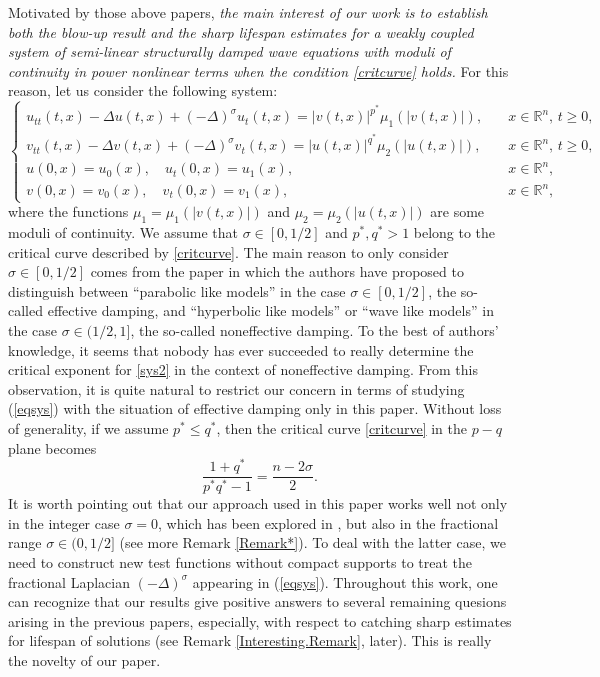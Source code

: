 \documentclass[11pt,reqno]{amsart}
\numberwithin{equation}{section}
\theoremstyle{plain}
\begin{document}
Motivated by those above papers, {\textit{the main interest of our work is to establish both the blow-up result and the sharp lifespan estimates for a weakly coupled system of semi-linear structurally damped wave equations with moduli of continuity in power nonlinear terms when the condition \eqref{critcurve} holds.}} For this reason, let us consider the following system:
\begin{equation}
\begin{cases} \label{eqsys}
    u_{tt}(t,x) -\Delta u(t,x) +(-\Delta)^{\sigma}u_t(t,x)=|v(t,x)|^{p^*}\mu_1(|v(t,x)|),\quad &x\in \mathbb{R}^n,\, t\geq 0,\\
    v_{tt}(t,x) -\Delta v(t,x) +(-\Delta)^{\sigma}v_t(t,x)=|u(t,x)|^{q^*}\mu_2(|u(t,x)|),\quad &x\in \mathbb{R}^n,\, t\geq 0,\\
    u(0,x)= u_0(x),\quad u_t(0,x)= u_1(x),\quad &x\in \mathbb{R}^n,\\
    v(0,x)= v_0(x),\quad v_t(0,x)= v_1(x),\quad &x\in \mathbb{R}^n,
\end{cases}
\end{equation}
where the functions $\mu_1=\mu_1(|v(t,x)|)$ and $\mu_2=\mu_2(|u(t,x)|)$ are some moduli of continuity. We assume that $\sigma\in [0,1/2]$ and $p^*, q^*>1$ belong to the critical curve described by \eqref{critcurve}. The main reason to only consider $\sigma\in [0,1/2]$ comes from the paper \cite{AbbRei2014} in which the authors have proposed to distinguish between ``parabolic like models'' in the case $\sigma\in [0,1/2]$, the so-called effective damping, and ``hyperbolic like models'' or ``wave like models'' in the case $\sigma\in (1/2,1]$, the so-called noneffective damping. To the best of authors' knowledge, it seems that nobody has ever succeeded to really determine the critical exponent for \eqref{sys2} in the context of noneffective damping. From this observation, it is quite natural to restrict our concern in terms of studying (\ref{eqsys}) with the situation of effective damping only in this paper. Without loss of generality, if we assume $p^*\leq q^*$, then the critical curve \eqref{critcurve} in the $p-q$ plane becomes
\begin{equation}\label{critcurve2}
    \frac{1+q^*}{p^*q^*-1}=\frac{n-2\sigma}{2}.
\end{equation}
It is worth pointing out that our approach used in this paper works well not only in the integer case $\sigma=0$, which has been explored in \cite{AnhRei2021}, but also in the fractional range $\sigma\in (0,1/2]$ (see more Remark \ref{Remark*}). To deal with the latter case, we need to construct new test functions without compact supports to treat the fractional Laplacian $(-\Delta)^{\sigma}$ appearing in (\ref{eqsys}). Throughout this work, one can recognize that our results give positive answers to several remaining quesions arising in the previous papers, especially, with respect to catching sharp estimates for lifespan of solutions (see Remark \ref{Interesting.Remark}, later). This is really the novelty of our paper. \medskip
\end{document}
